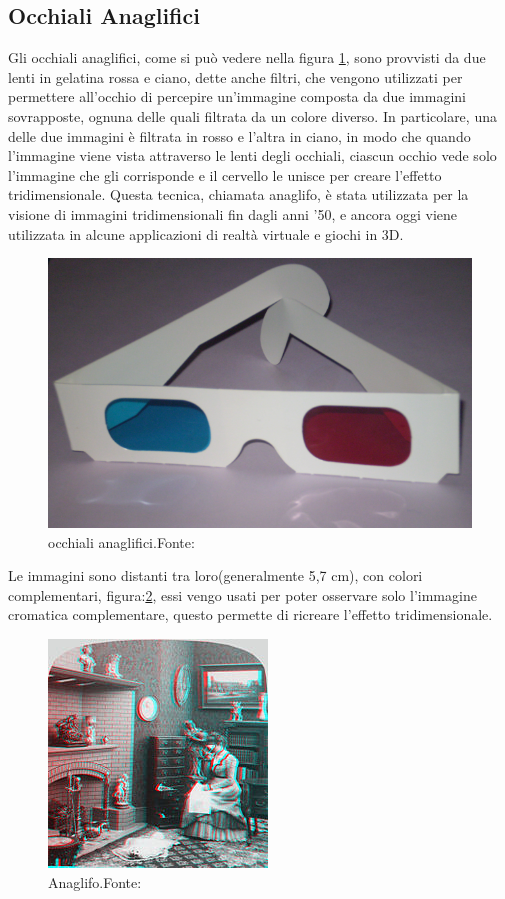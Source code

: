 \documentclass[
a4paper,
cleardoublepage=empty,
headings=twolinechapter,
numbers=autoenddot,
]{scrbook}
\begin{document}
	\subsection{Occhiali Anaglifici}\label{chap:occhiali_anaglifici}
	Gli occhiali anaglifici, come si può vedere nella figura \ref{fig:occhiali_anaglifici}, sono provvisti da due lenti in gelatina rossa e ciano, dette anche filtri, che vengono utilizzati per permettere all'occhio di percepire un'immagine composta da due immagini sovrapposte, ognuna delle quali filtrata da un colore diverso. In particolare, una delle due immagini è filtrata in rosso e l'altra in ciano, in modo che quando l'immagine viene vista attraverso le lenti degli occhiali, ciascun occhio vede solo l'immagine che gli corrisponde e il cervello le unisce per creare l'effetto tridimensionale. Questa tecnica, chiamata anaglifo, è stata utilizzata per la visione di immagini tridimensionali fin dagli anni '50, e ancora oggi viene utilizzata in alcune applicazioni di realtà virtuale e giochi in 3D.
	\begin{figure}[H]
		\centering
		\includegraphics[width=0.6\linewidth]{image/occhiali_anaglifici}
		\caption{occhiali anaglifici.Fonte:\cite{Anaglifo_image}}
		\label{fig:occhiali_anaglifici}
	\end{figure}
	Le immagini sono distanti tra loro(generalmente 5,7 cm), con colori complementari, figura:\ref{fig:anaglifo}, essi vengo usati per poter osservare solo l'immagine cromatica complementare, questo permette di ricreare l'effetto tridimensionale.
	 \begin{figure}[H]
	 	\centering
	 	\includegraphics[width=0.6\linewidth]{image/anaglifo}
	 	\caption{Anaglifo.Fonte:\cite{Anaglifo_image}}
	 	\label{fig:anaglifo}
	 \end{figure}
\end{document}
